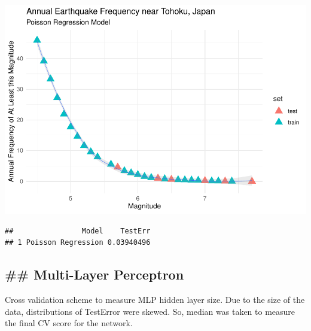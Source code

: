 \includegraphics{Appendix_eq_files/figure-latex/unnamed-chunk-3-1.pdf}

\begin{Shaded}
\begin{Highlighting}[]
\CommentTok{\# }
\OtherTok{\textless{}{-}} \NormalTok{(} \NormalTok{,}
                            \SpecialCharTok{$}\SpecialCharTok{{-}}\SpecialCharTok{$}\SpecialCharTok{\^{}}\NormalTok{))}
\end{Highlighting}
\end{Shaded}

\begin{verbatim}
##                Model    TestErr
## 1 Poisson Regression 0.03940496
\end{verbatim}

\hypertarget{multi-layer-perceptron}{%
\subsection{\#\# Multi-Layer Perceptron}\label{multi-layer-perceptron}}

Cross validation scheme to measure MLP hidden layer size. Due to the
size of the data, distributions of TestError were skewed. So, median was
taken to measure the final CV score for the network.

